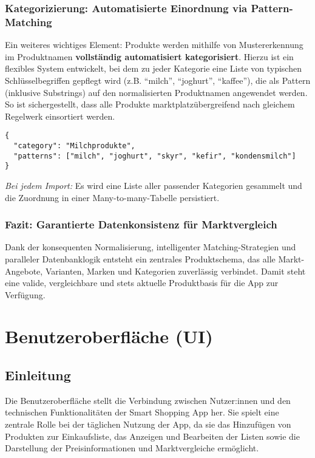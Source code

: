 \documentclass[12pt, a4paper]{report} %
\newcommand{\authorinitials}{} %
\begin{document}
\subsection{Kategorizierung: Automatisierte Einordnung via Pattern-Matching}

Ein weiteres wichtiges Element: Produkte werden mithilfe von Mustererkennung im Produktnamen \textbf{vollständig automatisiert kategorisiert}. Hierzu ist ein flexibles System entwickelt, bei dem zu jeder Kategorie eine Liste von typischen Schlüsselbegriffen gepflegt wird (z.B. "`milch"', "`joghurt"', "`kaffee"'), die als Pattern (inklusive Substrings) auf den normalisierten Produktnamen angewendet werden. So ist sichergestellt, dass alle Produkte marktplatzübergreifend nach gleichem Regelwerk einsortiert werden.

\begin{lstlisting}[style=typescriptstyle, caption={Beispielstruktur: Kategorie-Definitionen als JSON}]
{
  "category": "Milchprodukte",
  "patterns": ["milch", "joghurt", "skyr", "kefir", "kondensmilch"]
}
\end{lstlisting}

\emph{Bei jedem Import:} Es wird eine Liste aller passender Kategorien gesammelt und die Zuordnung in einer Many-to-many-Tabelle persistiert.

\subsection{Fazit: Garantierte Datenkonsistenz für Marktvergleich}

Dank der konsequenten Normalisierung, intelligenter Matching-Strategien und paralleler Datenbanklogik entsteht ein zentrales Produktschema, das alle Markt-Angebote, Varianten, Marken und Kategorien zuverlässig verbindet. Damit steht eine valide, vergleichbare und stets aktuelle Produktbasis für die App zur Verfügung.

\cleardoublepage


\chapter{Benutzeroberfläche (UI)}
\renewcommand{\authorinitials}{NK}
\label{chap:ui}

\section{Einleitung}
Die Benutzeroberfläche stellt die Verbindung zwischen Nutzer:innen und den technischen Funktionalitäten der Smart Shopping App her. Sie spielt eine zentrale Rolle bei der täglichen Nutzung der App, da sie das Hinzufügen von Produkten zur Einkaufsliste, das Anzeigen und Bearbeiten der Listen sowie die Darstellung der Preisinformationen und Marktvergleiche ermöglicht.
\end{document}
